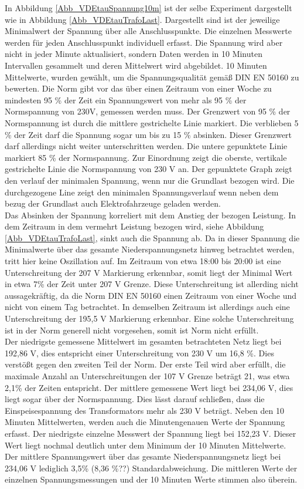 In Abbildung \ref{Abb_VDEtauSpannung10m} ist der selbe Experiment dargestellt wie in Abbildung \ref{Abb_VDEtauTrafoLast}. Dargestellt sind ist der jeweilige Minimalwert der Spannung über alle Anschlusspunkte. Die einzelnen Messwerte werden für jeden Anschlusspunkt individuell erfasst. Die Spannung wird aber nicht in jeder Minute aktualisiert, sondern Daten werden in 10 Minuten Intervallen gesammelt und deren Mittelwert wird abgebildet. 10 Minuten Mittelwerte, wurden gewählt, um die Spannungsqualität gemäß DIN EN 50160 zu bewerten. Die Norm gibt vor das über einen Zeitraum von einer Woche zu mindesten 95 \% der Zeit ein Spannungswert von mehr als 95 \% der Normspannung von 230V, gemessen werden muss. Der Grenzwert von 95 \% der Normspannung ist durch die mittlere gestrichelte Linie markiert. Die verblieben 5 \% der Zeit darf die Spannung sogar um bis zu 15 \% absinken. Dieser Grenzwert darf allerdings nicht weiter unterschritten werden. Die untere gepunktete Linie markiert 85 \% der Normspannung. Zur Einordnung zeigt die oberste, vertikale gestrichelte Linie die Normspannung von 230 V an. Der gepunktete Graph zeigt den verlauf der minimalen Spannung, wenn nur die Grundlast bezogen wird. Die durchgezogene Line zeigt den minimalen Spannungsverlauf wenn neben dem bezug der Grundlast auch Elektrofahrzeuge geladen werden.\\
Das Absinken der Spannung korreliert mit dem Anstieg der bezogen Leistung. In dem Zeitraum in dem vermehrt Leistung bezogen wird, siehe Abbildung \ref{Abb_VDEtauTrafoLast}, sinkt auch die Spannung ab. Da in dieser Spannung die Minimalwerte über das gesamte Niederspannungsnetz hinweg betrachtet werden, tritt hier keine Oszillation auf. Im Zeitraum von etwa 18:00 bis 20:00 ist eine Unterschreitung der 207 V Markierung erkennbar, somit liegt der Minimal Wert in etwa 7\% der Zeit unter 207 V Grenze. Diese Unterschreitung ist allerding nicht aussagekräftig, da die Norm DIN EN 50160 einen Zeitraum von einer Woche und nicht von einem Tag betrachtet. In demselben Zeitraum ist allerdings auch eine Unterschreitung der 195,5 V Markierung erkennbar. Eine solche Unterschreitung ist in der Norm generell nicht vorgesehen, somit ist Norm nicht erfüllt.\\
Der niedrigste gemessene Mittelwert im gesamten betrachteten Netz liegt bei 192,86 V, dies entspricht einer Unterschreitung von 230 V um 16,8 \%. Dies verstößt gegen den zweiten Teil der Norm. Der erste Teil wird aber erfüllt, die maximale Anzahl an Unterschreitungen der 107 V Grenze beträgt 21, was etwa 2,1\% der Zeiten entspricht. Der mittlere gemessene Wert liegt bei 234,06 V, dies liegt sogar über der Normspannung. Dies lässt darauf schließen, dass die Einspeisespannung des Transformators mehr als 230 V beträgt.
Neben den 10 Minuten Mittelwerten, werden auch die Minutengenauen Werte der Spannung erfasst. Der niedrigste einzelne Messwert der Spannung liegt bei 152,23 V.  Dieser Wert liegt nochmal deutlich unter dem Minimum der 10 Minuten Mittelwerte. Der mittlere Spannungswert über das gesamte Niederspannungsnetz liegt bei 234,06 V lediglich 3,5\% (8,36 \%??) Standardabweichung. Die mittleren Werte der einzelnen Spannungsmessungen und der 10 Minuten Werte stimmen also überein. \\

